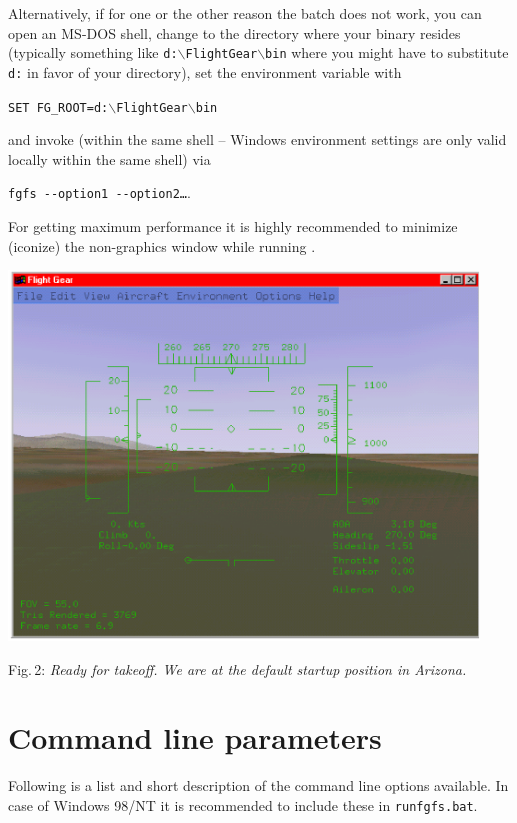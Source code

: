 Alternatively, if for one or the other reason the batch does not work, you can open an
MS-DOS shell, change to the directory where your binary resides (typically something like
\texttt{d:$\backslash$FlightGear$\backslash$bin} where you might have to substitute
\texttt{d:} in favor of your \FlightGear directory), set the environment variable with

\texttt{SET FG\_ROOT=d:$\backslash$FlightGear$\backslash$bin}

\noindent
 and invoke \FlightGear (within the same shell -- Windows environment
 settings are only valid locally within the same shell) via

\texttt{fgfs -$\!$-option1 -$\!$-option2\dots}.

For getting maximum performance it is highly recommended to
minimize (iconize) the non-graphics window while running
{\FlightGear}$\!$.
 \medskip

 \centerline{
\includegraphics[clip,width=12.5cm]{arizona.eps}
}

 \noindent
Fig.\,2: \textit{Ready for takeoff. We are at the default startup
position in Arizona.}
\medskip

\section{Command line parameters\label{options}}

Following is a list and short description of the command line options available. In case
of Windows 98/NT it is recommended to include these in \texttt{runfgfs.bat}.

